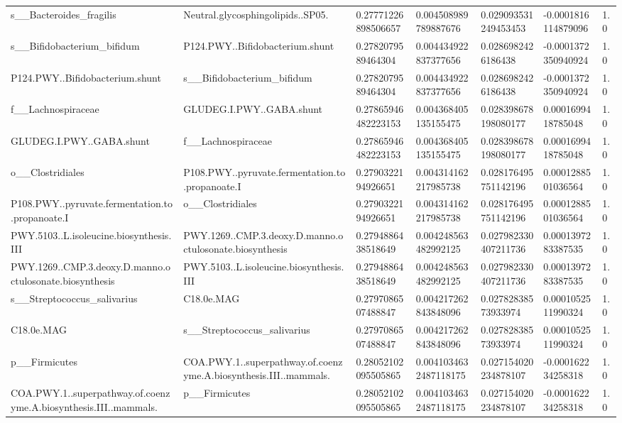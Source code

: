 \begin{longtable}{lllllll}
s\_\_Bacteroides\_fragilis & Neutral.glycosphingolipids..SP05. & 0.27771226898506657 & 0.004508989789887676 & 0.029093531249453453 & -0.0001816114879096 & 1.0 \\
s\_\_Bifidobacterium\_bifidum & P124.PWY..Bifidobacterium.shunt & 0.2782079589464304 & 0.004434922837377656 & 0.0286982426186438 & -0.0001372350940924 & 1.0 \\
P124.PWY..Bifidobacterium.shunt & s\_\_Bifidobacterium\_bifidum & 0.2782079589464304 & 0.004434922837377656 & 0.0286982426186438 & -0.0001372350940924 & 1.0 \\
f\_\_Lachnospiraceae & GLUDEG.I.PWY..GABA.shunt & 0.27865946482223153 & 0.004368405135155475 & 0.028398678198080177 & 0.0001699418785048 & 1.0 \\
GLUDEG.I.PWY..GABA.shunt & f\_\_Lachnospiraceae & 0.27865946482223153 & 0.004368405135155475 & 0.028398678198080177 & 0.0001699418785048 & 1.0 \\
o\_\_Clostridiales & P108.PWY..pyruvate.fermentation.to.propanoate.I & 0.2790322194926651 & 0.004314162217985738 & 0.028176495751142196 & 0.0001288501036564 & 1.0 \\
P108.PWY..pyruvate.fermentation.to.propanoate.I & o\_\_Clostridiales & 0.2790322194926651 & 0.004314162217985738 & 0.028176495751142196 & 0.0001288501036564 & 1.0 \\
PWY.5103..L.isoleucine.biosynthesis.III & PWY.1269..CMP.3.deoxy.D.manno.octulosonate.biosynthesis & 0.2794886438518649 & 0.004248563482992125 & 0.027982330407211736 & 0.0001397283387535 & 1.0 \\
PWY.1269..CMP.3.deoxy.D.manno.octulosonate.biosynthesis & PWY.5103..L.isoleucine.biosynthesis.III & 0.2794886438518649 & 0.004248563482992125 & 0.027982330407211736 & 0.0001397283387535 & 1.0 \\
s\_\_Streptococcus\_salivarius & C18.0e.MAG & 0.2797086507488847 & 0.004217262843848096 & 0.02782838573933974 & 0.0001052511990324 & 1.0 \\
C18.0e.MAG & s\_\_Streptococcus\_salivarius & 0.2797086507488847 & 0.004217262843848096 & 0.02782838573933974 & 0.0001052511990324 & 1.0 \\
p\_\_Firmicutes & COA.PWY.1..superpathway.of.coenzyme.A.biosynthesis.III..mammals. & 0.28052102095505865 & 0.0041034632487118175 & 0.027154020234878107 & -0.000162234258318 & 1.0 \\
COA.PWY.1..superpathway.of.coenzyme.A.biosynthesis.III..mammals. & p\_\_Firmicutes & 0.28052102095505865 & 0.0041034632487118175 & 0.027154020234878107 & -0.000162234258318 & 1.0 \\

\end{longtable}
